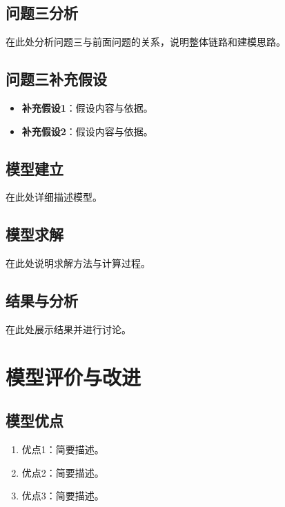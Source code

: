 \documentclass[12pt,a4paper]{article}
\begin{document}
\subsection{问题三分析}

在此处分析问题三与前面问题的关系，说明整体链路和建模思路。

\subsection{问题三补充假设}

\begin{itemize}
    \item \textbf{补充假设1}：假设内容与依据。
    \item \textbf{补充假设2}：假设内容与依据。
\end{itemize}

\subsection{模型建立}

在此处详细描述模型。

\subsection{模型求解}

在此处说明求解方法与计算过程。

\subsection{结果与分析}

在此处展示结果并进行讨论。

\section{模型评价与改进}

\subsection{模型优点}

\begin{enumerate}
    \item 优点1：简要描述。
    \item 优点2：简要描述。
    \item 优点3：简要描述。
\end{enumerate}
\end{document}
